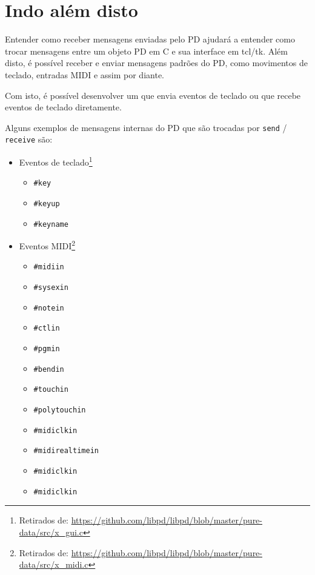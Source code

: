 \section{Indo além disto}

Entender como receber mensagens enviadas pelo PD ajudará a entender como trocar
mensagens entre um objeto PD em C e sua interface em tcl/tk.
Além disto, é possível receber e enviar mensagens padrões do PD, como movimentos
de teclado, entradas MIDI e assim por diante.

Com isto, é possível desenvolver um \external que envia eventos de teclado ou
que recebe eventos de teclado diretamente.

Alguns exemplos de mensagens internas do PD que são trocadas por \texttt{send} /
\texttt{receive} são:

\begin{itemize}
   \item Eventos de teclado\footnote{Retirados de: \url{https://github.com/libpd/libpd/blob/master/pure-data/src/x_gui.c}}
   \begin{itemize}
      \item \texttt{\#key}
      \item \texttt{\#keyup}
      \item \texttt{\#keyname}
   \end{itemize}
   \item Eventos MIDI\footnote{Retirados de: \url{https://github.com/libpd/libpd/blob/master/pure-data/src/x_midi.c}}
   \begin{itemize}
      \item \texttt{\#midiin}
      \item \texttt{\#sysexin}
      \item \texttt{\#notein}
      \item \texttt{\#ctlin}
      \item \texttt{\#pgmin}
      \item \texttt{\#bendin}
      \item \texttt{\#touchin}
      \item \texttt{\#polytouchin}
      \item \texttt{\#midiclkin}
      \item \texttt{\#midirealtimein}
      \item \texttt{\#midiclkin}
      \item \texttt{\#midiclkin}
   \end{itemize}
\end{itemize}

